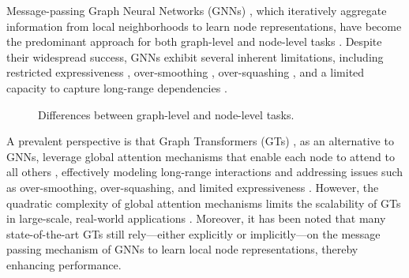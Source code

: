 Message-passing Graph Neural Networks (GNNs) \cite{gilmer2017neural}, which iteratively aggregate information from local neighborhoods to learn node representations, have become the predominant approach for both graph-level and node-level tasks \cite{niepert2016learning,kipf2017semisupervised,velivckovic2018graph,xu2018powerful,bresson2017residual,wu2020comprehensive}. Despite their widespread success, GNNs exhibit several inherent limitations, including restricted expressiveness \cite{xu2018powerful,morris2019weisfeiler}, over-smoothing \cite{li2018deeper,chen2020measuring}, over-squashing \cite{alon2020bottleneck}, and a limited capacity to capture long-range dependencies \cite{dwivedi2022long}.

\begin{figure}[t]      \vspace{-0.05 in} \caption{\label{1} 
Differences between graph-level and node-level tasks.} \vspace{-0.15 in}  \label{fig:graphlevel} \end{figure}

A prevalent perspective is that Graph Transformers (GTs) \cite{muller2023attending,min2022transformer,hoang2024survey}, as an alternative to GNNs, leverage global attention mechanisms that enable each node to attend to all others \cite{yun2019graph,dwivedi2020generalization}, effectively modeling long-range interactions and addressing issues such as over-smoothing, over-squashing, and limited expressiveness \cite{kreuzer2021rethinking,ying2021transformers,zhang2023rethinking,luo2023transformers,luo2024transformers}. %
However, the quadratic complexity of global attention mechanisms limits the scalability of GTs in large-scale, real-world applications \cite{behrouz2024graph,sancak2024scalable,ding2024recurrent}.
Moreover, it has been noted that many state-of-the-art GTs \cite{chen2022structure,rampavsek2022recipe,shirzad2023exphormer,ma2023graph} still rely—either explicitly or implicitly—on the message passing mechanism of GNNs to learn local node representations, thereby enhancing performance.

